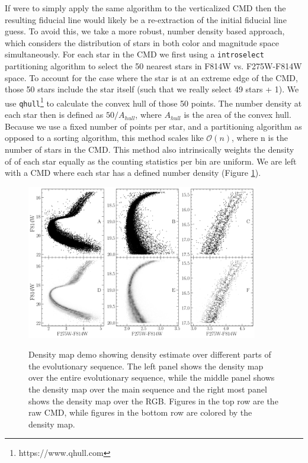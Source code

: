 If \fidanka were to simply apply the same algorithm to the verticalized CMD
then the resulting fiducial line would likely be a re-extraction of the initial
fiducial line guess. To avoid this, we take a more robust, number density based
approach, which considers the distribution of stars in both color and magnitude
space simultaneously. For each star in the CMD we first using a
\texttt{introselect} partitioning algorithm to select the 50 nearest stars in F814W vs. F275W-F814W space.
To account for the case where the star is at an extreme edge of the CMD, those
50 stars include the star itself (such that we really select 49 stars + 1). We
use \texttt{qhull}\footnote{https://www.qhull.com}\citep{Barber1996, } to
calculate the convex hull of those 50 points. The number density at each star
then is defined as $50/A_{hull}$, where $A_{hull}$ is the area of the convex
hull. Because we use a fixed number of points per star, and a partitioning
algorithm as opposed to a sorting algorithm, this method scales like
$\mathcal{O}(n)$, where n is the number of stars in the CMD. This method also
intrinsically weights the density of of each star equally as the counting
statistics per bin are uniform. We are left with a CMD where each star
has a defined number density (Figure \ref{fig:densityMapDemo}).

\begin{figure}
	\centering
	\includegraphics[width=0.9\textwidth]{figures/ngc2808/notebookFigures/DensityMapDemo.png}
	\label{fig:densityMapDemo}
	\caption{Density map demo showing density estimate over different parts of
	the evolutionary sequence. The left panel shows the density map over the
	entire evolutionary sequence, while the middle panel shows the density map
	over the main sequence and the right most panel shows the density map over
	the RGB. Figures in the top row are the raw CMD, while figures in the
	bottom row are colored by the density map.}
\end{figure}

